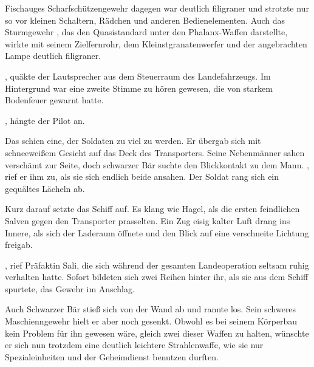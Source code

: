 \par

Fischauges Scharfschützengewehr dagegen war deutlich filigraner und strotzte nur so vor kleinen Schaltern, Rädchen und anderen Bedienelementen. Auch das Sturmgewehr , das den Quasistandard unter den Phalanx-Waffen darstellte, wirkte mit seinem Zielfernrohr, dem Kleinstgranatenwerfer und der angebrachten Lampe deutlich filigraner.

\par

, quäkte der Lautsprecher aus dem Steuerraum des Landefahrzeugs. Im Hintergrund war eine zweite Stimme zu hören gewesen, die von starkem Bodenfeuer gewarnt hatte.

\par

, hängte der Pilot an. 

\par

Das schien eine, der Soldaten zu viel zu werden. Er übergab sich mit schneeweißem Gesicht auf das Deck des Transporters. Seine Nebenmänner sahen verschämt zur Seite, doch schwarzer Bär suchte den Blickkontakt zu dem Mann. , rief er ihm zu, als sie sich endlich beide ansahen.  Der Soldat rang sich ein gequältes Lächeln ab.

\par

Kurz darauf setzte das Schiff auf. Es klang wie Hagel, als die ersten feindlichen Salven gegen den Transporter prasselten. Ein Zug eisig kalter Luft drang ins Innere, als sich der Laderaum öffnete und den Blick auf eine verschneite Lichtung freigab.

\par

, rief Präfaktin Sali, die sich während der gesamten Landeoperation seltsam ruhig verhalten hatte. Sofort bildeten sich zwei Reihen hinter ihr, als sie aus dem Schiff spurtete, das Gewehr im Anschlag.

\par

Auch Schwarzer Bär stieß sich von der Wand ab und rannte los. Sein schweres Maschienngewehr hielt er aber noch gesenkt. Obwohl es bei seinem Körperbau kein Problem für ihn gewesen wäre, gleich zwei dieser Waffen zu halten, wünschte er sich nun trotzdem eine deutlich leichtere Strahlenwaffe, wie sie nur Spezialeinheiten und der Geheimdienst benutzen durften.

